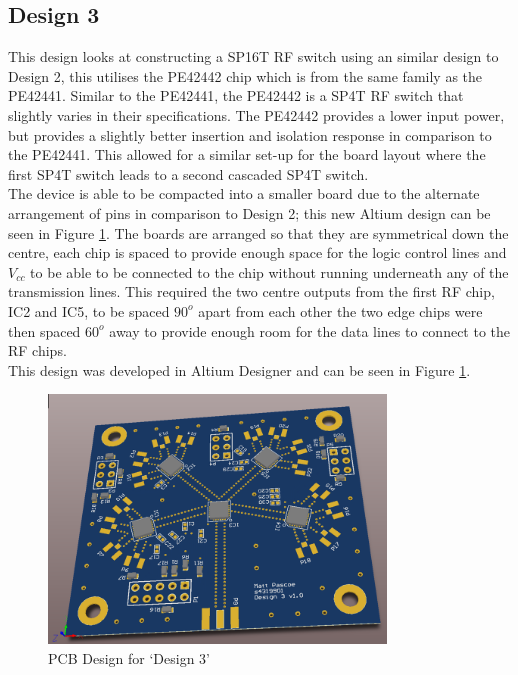 \documentclass[12pt,openany,a4paper]{book}
\begin{document}
\subsection{Design 3}		\label{sec:design3}
This design looks at constructing a SP16T RF switch using an similar design to Design 2, this utilises the PE42442 chip which is from the same family as the PE42441. Similar to the PE42441, the PE42442 is a SP4T RF switch that slightly varies in their specifications. The PE42442 provides a lower input power, but provides a slightly better insertion and isolation response in comparison to the PE42441. This allowed for a similar set-up for the board layout where the first SP4T switch leads to a second cascaded SP4T switch.\\[0.2cm]
The device is able to be compacted into a smaller board due to the alternate arrangement of pins in comparison to Design 2; this new Altium design can be seen in Figure \ref{fig:design3}. The boards are arranged so that they are symmetrical down the centre, each chip is spaced to provide enough space for the logic control lines and $V_{cc}$ to be able to be connected to the chip without running underneath any of the transmission lines. This required the two centre outputs from the first RF chip, IC2 and IC5, to be spaced $90^o$ apart from each other the two edge chips were then spaced $60^o$ away to provide enough room for the data lines to connect to the RF chips.\\[0.2cm]
This design was developed in Altium Designer and can be seen in Figure \ref{fig:design3}.
\begin{figure}[H]
	\centering
    \includegraphics[width=0.8\textwidth]{design3_pcb.png}
	\caption{PCB Design for `Design 3'}
	\label{fig:design3}
\end{figure} 
\end{document}
